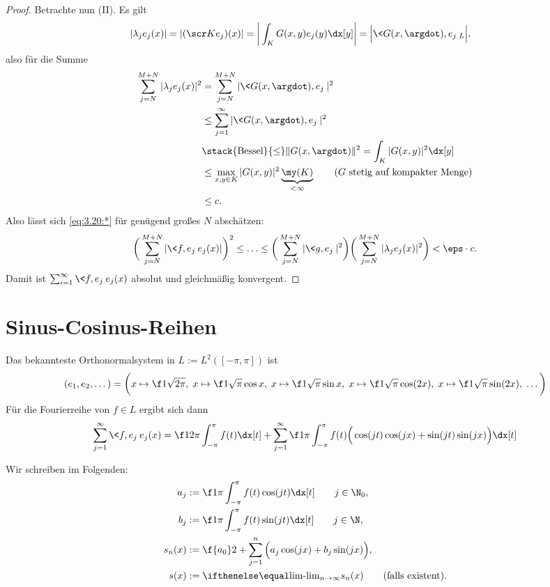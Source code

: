\begin{st}
\begin{proof}
		Betrachte nun (II).
		Es gilt
		\begin{align*}
			|\lambda_j e_j(x)|
			= |(\scr K e_j)(x)|
			&= \bigg|\int_{K} G(x,y) e_j(y) \dx[y]\bigg|
			= \Big|\<G(x,\argdot), e_j \>_L \Big|,
		\end{align*}
		also für die Summe
		\begin{align*}
			\sum_{j=N}^{M+N} |\lambda_j e_j(x)|^2
			&= \sum_{j=N}^{M+N} |\<G(x,\argdot), e_j\>|^2 \\
			&\le \sum_{j=1}^\infty |\<G(x,\argdot), e_j\>|^2 \\
			&\stack{\text{Bessel}}{\le} \|G(x,\argdot)\|^2 
			= \int_K |G(x,y)|^2 \dx[y]\\
			&\le \max_{x,y \in K} |G(x,y)|^2 \underbrace{\my(K)}_{< \infty}  \qquad \text{($G$ stetig auf kompakter Menge)} \\
			&\le c.
		\end{align*}
		Also lässt sich \eqref{eq:3.20:*} für genügend großes $N$ abschätzen:
		\[
			\bigg( \sum_{j=N}^{M+N} |\<f,e_j\> e_j(x) | \bigg)^2
			\le \dotsc \le 
			\bigg( \sum_{j=N}^{M+N} |\<g,e_j\>|^2 \bigg) \bigg(\sum_{j=N}^{M+N}|\lambda_j e_j(x)|^2\bigg)
			< \eps \cdot c.
		\]
		Damit ist $\sum_{i=1}^\infty \<f,e_j\>e_j(x)$ absolut und gleichmäßig konvergent.
	\end{proof}
\end{st}


\section{Sinus-Cosinus-Reihen}

Das bekannteste Orthonormalsystem in $L := L^2([-\pi, \pi])$ ist
\begin{align*}
	(e_1, e_2, \dotsc ) = \bigg( x \mapsto \f 1{\sqrt{2\pi}},\; 
	x \mapsto \f 1{\sqrt \pi} \cos x,\; 
	x \mapsto \f 1{\sqrt \pi} \sin x, \;
	x \mapsto \f 1{\sqrt \pi} \cos(2x), \;
	x \mapsto \f 1{\sqrt \pi} \sin(2x),\; \dotsc \bigg)
\end{align*}
Für die Fourierreihe von $f \in L$ ergibt sich dann
\begin{align*}
	\sum_{j=1}^\infty \<f,e_j\> e_j(x)
	= \f 1{2\pi} \int_{-\pi}^{\pi} f(t) \dx[t] + \sum_{j=1}^\infty \f 1{\pi} \int_{-\pi}^{\pi} f(t) \Big( \cos(jt) \cos(jx) + \sin(jt) \sin(jx) \Big) \dx[t]
\end{align*}

\begin{nt}[Notation] \label{3.21}
	Wir schreiben im Folgenden:
	\begin{align*}
		a_j &:= \f 1{\pi} \int_{-\pi}^{\pi} f(t) \cos(jt) \dx[t] \qquad j\in \N_0, \\
		b_j &:= \f 1{\pi} \int_{-\pi}^{\pi} f(t) \sin(jt) \dx[t] \qquad j\in \N, \\
		s_n(x) &:= \f {a_0}2 + \sum_{j=1}^n \Big( a_j \cos(jx) + b_j \sin(jx) \Big), \\
		s(x) &:= \lim_{n\to \infty} s_n(x) \qquad \text{(falls existent)}.
	\end{align*}
\end{nt}


